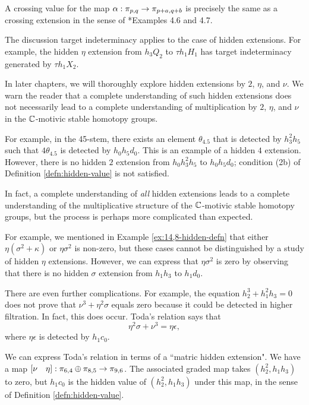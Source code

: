A crossing value for the map 
$\alpha: \pi_{p,q} \rightarrow \pi_{p+a,q+b}$
is precisely the same
as a crossing extension in the sense of \cite{Isaksen14c}*{Examples
4.6 and 4.7}.

The discussion target indeterminacy
applies to the case of hidden extensions.
For example, the hidden $\eta$ extension from
$h_3 Q_2$ to $\tau h_1 H_1$ has target indeterminacy
generated by $\tau h_1 X_2$.

In later chapters, we will thoroughly explore hidden extensions
by $2$, $\eta$, and $\nu$.  We warn the reader that a complete
understanding of such hidden extensions does not necessarily
lead to a complete understanding of multiplication by
$2$, $\eta$, and $\nu$ in the $\mathbb{C}$-motivic stable homotopy groups.

For example, in the 45-stem, 
there exists an element $\theta_{4.5}$ that
is detected by $h_3^2 h_5$ such that $4 \theta_{4.5}$ is detected
by $h_0 h_5 d_0$.  This is an example of a hidden $4$ extension.
However, there is no hidden $2$ extension from
$h_0 h_3^2 h_5$ to $h_0 h_5 d_0$; condition (2b) of
Definition \ref{defn:hidden-value} is not satisfied.

In fact, a complete understanding of \emph{all} hidden
extensions leads to a complete understanding of the multiplicative
structure of the $\mathbb{C}$-motivic stable homotopy groups, but the process is
perhaps more complicated than expected.

For example, we mentioned in Example \ref{ex:14,8-hidden-defn}
that either $\eta (\sigma^2 + \kappa)$ or $\eta \sigma^2$ 
is non-zero, but these cases cannot be distinguished by a study
of hidden $\eta$ extensions.  However, we can express
that $\eta \sigma^2$ is zero by observing that there is
no hidden $\sigma$
extension from $h_1 h_3$ to $h_1 d_0$.

There are even further complications.  For example, 
the equation $h_2^3 + h_1^2 h_3 = 0$ does not prove that
$\nu^3 + \eta^2 \sigma$ equals zero because it could be detected
in higher filtration.  In fact, this does occur.  
Toda's relation \cite{Toda62} says that 
\[
\eta^2 \sigma + \nu^3 = \eta \epsilon,
\]
where $\eta \epsilon$ is detected by $h_1 c_0$.

We can express Toda's relation in terms of a ``matric hidden extension".
We have a map 
$[ \nu \quad \eta]: \pi_{6,4} \oplus \pi_{8,5} \rightarrow \pi_{9,6}$.
The associated graded map takes $(h_2^2, h_1 h_3)$ to zero,
but $h_1 c_0$ is the hidden value of $(h_2^2, h_1 h_3)$ under this 
map, in the sense of Definition \ref{defn:hidden-value}.

